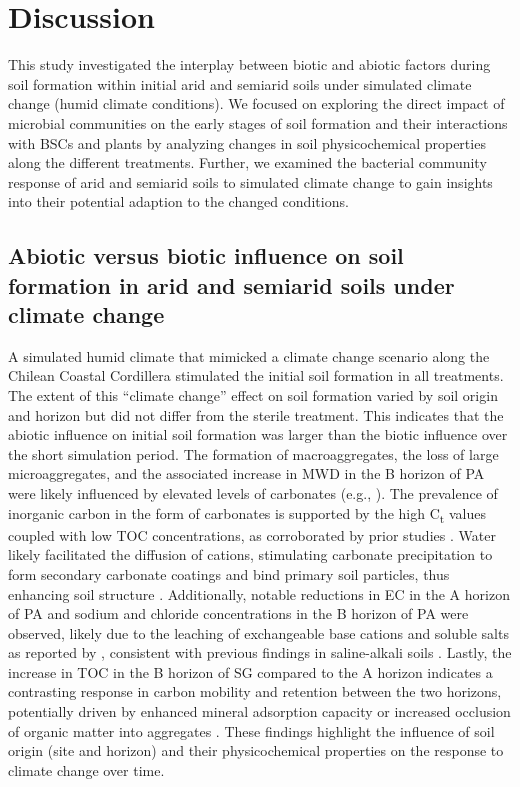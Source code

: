 \section{Discussion}

This study investigated the interplay between biotic and abiotic factors during soil formation within initial arid and semiarid soils under simulated climate change (humid climate conditions). We focused on exploring the direct impact of microbial communities on the early stages of soil formation and their interactions with BSCs and plants by analyzing changes in soil physicochemical properties along the different treatments. Further, we examined the bacterial community response of arid and semiarid soils to simulated climate change to gain insights into their potential adaption to the changed conditions.

\subsection{Abiotic versus biotic influence on soil formation in arid and semiarid soils under climate change}

A simulated humid climate that mimicked a climate change scenario along the Chilean Coastal Cordillera stimulated the initial soil formation in all treatments. The extent of this ``climate change'' effect on soil formation varied by soil origin and horizon but did not differ from the sterile treatment. This indicates that the abiotic influence on initial soil formation was larger than the biotic influence over the short simulation period. The formation of macroaggregates, the loss of large microaggregates, and the associated increase in MWD in the B horizon of PA were likely influenced by elevated levels of carbonates (e.g., ). The prevalence of inorganic carbon in the form of carbonates is supported by the high C\textsubscript{t} values coupled with low TOC concentrations, as corroborated by prior studies \citep{SchulzeMakuch2018, RiverasMunoz2022}. Water likely facilitated the diffusion of cations, stimulating carbonate precipitation to form secondary carbonate coatings and bind primary soil particles, thus enhancing soil structure \citep{Bronick2005}. Additionally, notable reductions in EC in the A horizon of PA and sodium and chloride concentrations in the B horizon of PA were observed, likely due to the leaching of exchangeable base cations and soluble salts as reported by \citet{Bernhard2018}, consistent with previous findings in saline-alkali soils \citep{Wang2017}. Lastly, the increase in TOC in the B horizon of SG compared to the A horizon indicates a contrasting response in carbon mobility and retention between the two horizons, potentially driven by enhanced mineral adsorption capacity or increased occlusion of organic matter into aggregates \citep{Kramer2018}. These findings highlight the influence of soil origin (site and horizon) and their physicochemical properties on the response to climate change over time.


